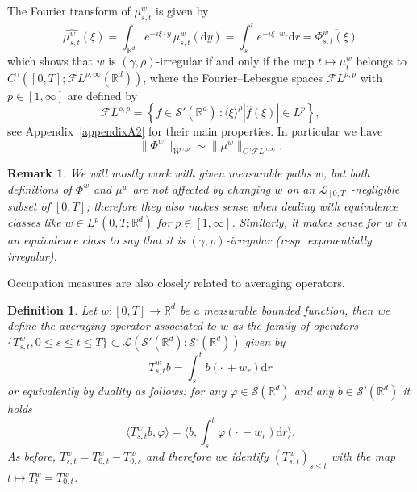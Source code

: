 \documentclass[10pt]{article}
\newcommand{\mathd}{\mathrm{d}}
\newtheorem{definition}[theorem]{Definition}
\newtheorem{remark}[theorem]{Remark}
\begin{document}
The Fourier transform of $\mu^w_{s, t}$ is given by
\[ \widehat{\mu_{s, t}^w} (\xi) = \int_{\mathbb{R}^d} e^{- i \xi \cdot y} \,
   \mu_{s, t}^w (\mathd y) = \int_s^t e^{- i \xi \cdot w_r} \mathd r =
   \overline{\Phi^w_{s, t} (\xi)} \]
which shows that $w$ is $(\gamma, \rho)$\mbox{-}irregular if and only if the
map $t \mapsto \mu^w_t$ belongs to $C^{\gamma} ([0, T] ; \mathcal{F} L^{\rho,
\infty} (\mathbb{R}^d))$, where the Fourier--Lebesgue spaces $\mathcal{F}
L^{\rho, p}$ with $p \in [1, \infty]$ are defined by
\[ \mathcal{F} L^{\rho, p} = \left\{ f \in \mathcal{S}' (\mathbb{R}^d) \, :
   \langle \xi \rangle^{\rho} | \hat{f} (\xi) | \in L^p \right\}, \]
see Appendix~\ref{appendixA2} for their main properties. In particular we have
\begin{equation}
  \| \Phi^w \|_{\mathcal{W}^{\gamma, \rho}} \sim \| \mu^w \|_{C^{\gamma}
  \mathcal{F} L^{\rho, \infty}} . \label{eq:link-occupatio-rho}
\end{equation}
\begin{remark}
  \label{sec2.3 remark equivalence class}We will mostly work with given
  measurable paths $w$, but both definitions of $\Phi^w$ and $\mu^w$ are not
  affected by changing $w$ on an $\mathcal{L}_{[0, T]}$\mbox{-}negligible
  subset of $[0, T]$; therefore they also makes sense when dealing with
  equivalence classes like $w \in L^p (0, T ; \mathbb{R}^d)$ for $p \in [1,
  \infty]$. Similarly, it makes sense for $w$ in an equivalence class to say
  that it is $(\gamma, \rho)$\mbox{-}irregular (resp. exponentially
  irregular).
\end{remark}

Occupation measures are also closely related to averaging operators.

\begin{definition}
  \label{sec2.3 defn averaging operator}Let $w : [0, T] \rightarrow
  \mathbb{R}^d$ be a measurable bounded function, then we define the averaging
  operator associated to $w$ as the family of operators $\{ T^w_{s, t}, 0
  \leqslant s \leqslant t \leqslant T \} \subset \mathcal{L} (\mathcal{S}'
  (\mathbb{R}^d) ; \mathcal{S}' (\mathbb{R}^d))$ given by
  \[ T^w_{s, t} b = \int_s^t b \left( \cdot \, + w_r \right) \mathd r \]
  or equivalently by duality as follows: for any $\varphi \in \mathcal{S}
  (\mathbb{R}^d)$ and any $b \in \mathcal{S}' (\mathbb{R}^d)$ it holds
  \begin{equation}
    \langle T^w_{s, t} b, \varphi \rangle = \langle b, \int_s^t \varphi \left(
    \cdot \, - w_r \right) \mathd r \rangle . \label{sec2.3 defn averaging
    duality}
  \end{equation}
  As before, $T^w_{s, t} = T^w_{0, t} - T^w_{0, s}$ and therefore we identify
  $(T^w_{s, t})_{s \leqslant t}$ with the map $t \mapsto T^w_t = T^w_{0, t}$.
\end{definition}
\end{document}
